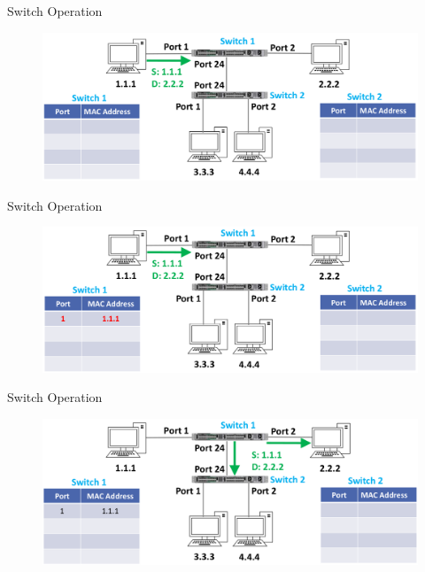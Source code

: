 \documentclass[pdflatex,compress,mathserif]{beamer}
\begin{document}
\begin{frame}{Switch Operation}
	\begin{figure}
		\centering
		\includegraphics[width=\linewidth]{img/img12}
	\end{figure}
\end{frame}

\begin{frame}{Switch Operation}
	\begin{figure}
		\centering
		\includegraphics[width=\linewidth]{img/img13}
	\end{figure}
\end{frame}

\begin{frame}{Switch Operation}
	\begin{figure}
		\centering
		\includegraphics[width=\linewidth]{img/img14}
	\end{figure}
\end{frame}
\end{document}
